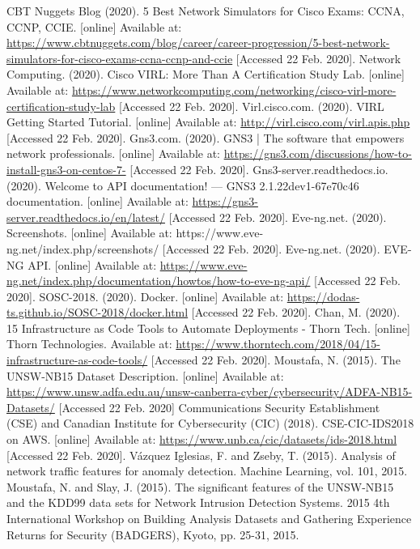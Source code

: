 \documentclass[conference]{IEEEtran}
\begin{document}
\begin{thebibliography}{00}
 CBT Nuggets Blog (2020). 5 Best Network Simulators for Cisco Exams: CCNA, CCNP, CCIE. [online] Available at: \newline\url{https://www.cbtnuggets.com/blog/career/career-progression/5-best-network-simulators-for-cisco-exams-ccna-ccnp-and-ccie} [Accessed 22 Feb. 2020].
 Network Computing. (2020). Cisco VIRL: More Than A Certification Study Lab. [online] Available at: \url{https://www.networkcomputing.com/networking/cisco-virl-more-certification-study-lab} [Accessed 22 Feb. 2020].
 Virl.cisco.com. (2020). VIRL Getting Started Tutorial. [online] Available at: \url{http://virl.cisco.com/virl.apis.php} [Accessed 22 Feb. 2020].
 Gns3.com. (2020). GNS3 | The software that empowers network professionals. [online] Available at: \url{https://gns3.com/discussions/how-to-install-gns3-on-centos-7-} [Accessed 22 Feb. 2020].
 Gns3-server.readthedocs.io. (2020). Welcome to API documentation! — GNS3 2.1.22dev1-67e70c46 documentation. [online] Available at: \url{https://gns3-server.readthedocs.io/en/latest/} [Accessed 22 Feb. 2020].
 Eve-ng.net. (2020). Screenshots. [online] Available at: https://www.eve-ng.net/index.php/screenshots/ [Accessed 22 Feb. 2020].
 Eve-ng.net. (2020). EVE-NG API. [online] Available at: \url{https://www.eve-ng.net/index.php/documentation/howtos/how-to-eve-ng-api/} [Accessed 22 Feb. 2020].
 SOSC-2018. (2020). Docker. [online] Available at: \url{https://dodas-ts.github.io/SOSC-2018/docker.html} [Accessed 22 Feb. 2020].
 Chan, M. (2020). 15 Infrastructure as Code Tools to Automate Deployments - Thorn Tech. [online] Thorn Technologies. Available at: \url{https://www.thorntech.com/2018/04/15-infrastructure-as-code-tools/} [Accessed 22 Feb. 2020].
 Moustafa, N. (2015). The UNSW-NB15 Dataset Description. [online] Available at: \url{https://www.unsw.adfa.edu.au/unsw-canberra-cyber/cybersecurity/ADFA-NB15-Datasets/} [Accessed 22 Feb. 2020]
 Communications Security Establishment (CSE) and Canadian Institute for Cybersecurity (CIC) (2018). CSE-CIC-IDS2018 on AWS. [online] Available at: \url{https://www.unb.ca/cic/datasets/ids-2018.html} [Accessed 22 Feb. 2020].
 Vázquez Iglesias, F. and Zseby, T. (2015). Analysis of network traffic features for anomaly detection. Machine Learning, vol. 101, 2015.
 Moustafa, N. and Slay, J. (2015). The significant features of the UNSW-NB15 and the KDD99 data sets for Network Intrusion Detection Systems. 2015 4th International Workshop on Building Analysis Datasets and Gathering Experience Returns for Security (BADGERS), Kyoto, pp. 25-31, 2015.

\end{thebibliography}
\end{document}
